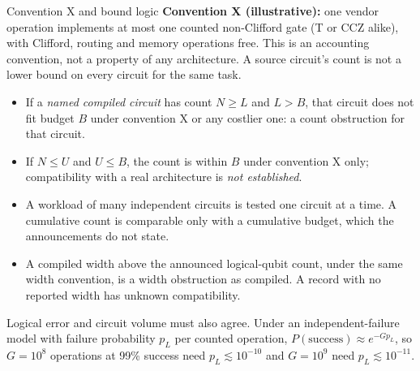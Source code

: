 \documentclass[10pt,a4paper]{article}
\begin{document}
\begin{rulebox}{Convention X and bound logic}
\textbf{Convention X (illustrative):} one vendor operation implements at most one counted non-Clifford gate (T or CCZ alike), with Clifford, routing and memory operations free. This is an accounting convention, not a property of any architecture. A source circuit's count is not a lower bound on every circuit for the same task.
\begin{itemize}
\item If a \emph{named compiled circuit} has count $N\ge L$ and $L>B$, that circuit does not fit budget $B$ under convention X or any costlier one: a count obstruction for that circuit.
\item If $N\le U$ and $U\le B$, the count is within $B$ under convention X only; compatibility with a real architecture is \emph{not established}.
\item A workload of many independent circuits is tested one circuit at a time. A cumulative count is comparable only with a cumulative budget, which the announcements do not state.
\item A compiled width above the announced logical-qubit count, under the same width convention, is a width obstruction as compiled. A record with no reported width has unknown compatibility.
\end{itemize}
\end{rulebox}
Logical error and circuit volume must also agree. Under an independent-failure model with failure probability $p_L$ per counted operation, $P(\text{success})\approx e^{-Gp_L}$, so $G=10^8$ operations at 99\% success need $p_L\lesssim10^{-10}$ and $G=10^9$ need $p_L\lesssim10^{-11}$.
\end{document}
